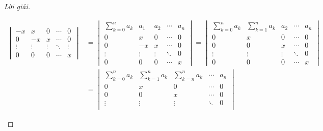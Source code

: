 \begin{proof}[Lời giải]
\begin{enumerate}[label = (\alph*)]
\begin{align*}
\begin{vmatrix}
                      -x     & x      & 0      & \cdots & 0      \\
                      0      & -x     & x      & \cdots & 0      \\
                      \vdots & \vdots & \vdots & \ddots & \vdots \\
                      0      & 0      & 0      & \cdots & x
                  \end{vmatrix}
                   & =
                  \begin{vmatrix}
                      \sum^{n}_{k=0}a_{k} & a_{1}  & a_{2}  & \cdots & a_{n} \\
                      0                   & x      & 0      & \cdots & 0     \\
                      0                   & -x     & x      & \cdots & 0     \\
                      \vdots              & \vdots & \vdots & \ddots & 0     \\
                      0                   & 0      & 0      & \cdots & x
                  \end{vmatrix}
                  =
                  \begin{vmatrix}
                      \sum^{n}_{k=0}a_{k} & \sum^{n}_{k=1}a_{k} & a_{2}  & \cdots & a_{n} \\
                      0                   & x                   & 0      & \cdots & 0     \\
                      0                   & 0                   & x      & \cdots & 0     \\
                      \vdots              & \vdots              & \vdots & \ddots & 0     \\
                      0                   & 0                   & 0      & \cdots & x
                  \end{vmatrix} \\
                   & =
                  \begin{vmatrix}
                      \sum^{n}_{k=0}a_{k} & \sum^{n}_{k=1}a_{k} & \sum^{n}_{k=n}a_{k} & \cdots & a_{n} \\
                      0                   & x                   & 0                   & \cdots & 0     \\
                      0                   & 0                   & x                   & \cdots & 0     \\
                      \vdots              & \vdots              & \vdots              & \ddots & 0     \\

\end{vmatrix}
\end{align*}
\end{enumerate}
\end{proof}
